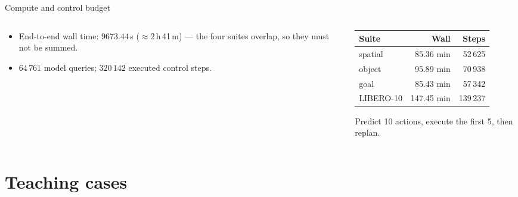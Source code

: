\begin{frame}{Compute and control budget}
  \begin{columns}[T]
    \begin{column}{0.44\linewidth}
      \begin{itemize}
        \item End-to-end wall time: $9673.44$\,s ($\approx 2$\,h\,41\,m) ---
              the four suites overlap, so they must not be summed.
        \item $64\,761$ model queries; $320\,142$ executed control steps.
      \end{itemize}
    \end{column}
    \begin{column}{0.52\linewidth}
      \centering
      \vspace{-1mm}
      \begin{tabular}{@{}lrr@{}}
        \toprule
        Suite & Wall & Steps \\
        \midrule
        spatial   & 85.36 min  & 52\,625  \\
        object    & 95.89 min  & 70\,938  \\
        goal      & 85.43 min  & 57\,342  \\
        LIBERO-10 & 147.45 min & 139\,237 \\
        \bottomrule
      \end{tabular}
      \vfill
      {\scriptsize Predict 10 actions, execute the first 5, then replan.}
    \end{column}
  \end{columns}
\end{frame}

\section{Teaching cases}

